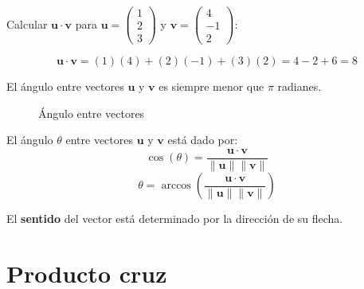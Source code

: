 \begin{example}
Calcular $\mathbf{u} \cdot \mathbf{v}$ para $\mathbf{u} = \begin{pmatrix} 1 \\ 2 \\ 3 \end{pmatrix}$ y $\mathbf{v} = \begin{pmatrix} 4 \\ -1 \\ 2 \end{pmatrix}$:

\begin{myproof}
$$\mathbf{u} \cdot \mathbf{v} = (1)(4) + (2)(-1) + (3)(2) = 4 - 2 + 6 = 8$$
\end{myproof}
\end{example}


\begin{rem}
El ángulo entre vectores $\mathbf{u}$ y $\mathbf{v}$ es siempre menor que $\pi$ radianes.

\begin{figure}[!htbp]
\centering
{}
\caption{Ángulo entre vectores}
\label{fig:angulo_vectores}
\end{figure}
\end{rem}


\begin{definition}
El ángulo $\theta$ entre vectores $\mathbf{u}$ y $\mathbf{v}$ está dado por:
$$\cos(\theta) = \frac{\mathbf{u} \cdot \mathbf{v}}{\|\mathbf{u}\| \|\mathbf{v}\|}$$
$$\theta = \arccos\left(\frac{\mathbf{u} \cdot \mathbf{v}}{\|\mathbf{u}\| \|\mathbf{v}\|}\right)$$
\end{definition}

El \textbf{sentido} del vector está determinado por la dirección de su flecha.

\section{Producto cruz}

